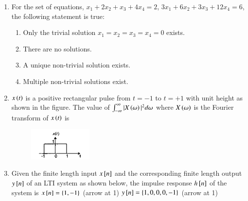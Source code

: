 \documentclass[12pt]{article}
\theoremstyle{remark}
\begin{document}
\begin{enumerate}
\item For the set of equations, $x_1 + 2x_2 + x_3 + 4x_4 = 2$, $3x_1 + 6x_2 + 3x_3 + 12x_4 = 6$, the following statement is true:
\begin{enumerate}
    \item Only the trivial solution $x_1=x_2=x_3=x_4=0$ exists.
    \item There are no solutions.
    \item A unique non-trivial solution exists.
    \item Multiple non-trivial solutions exist.
\end{enumerate}
\hfill{}

\item $x\left(t\right)$ is a positive rectangular pulse from $t=-1$ to $t=+1$ with unit height as shown in the figure. The value of $\int_{-\infty}^{\infty} |X\left(\omega\right)|^2 d\omega$ where $X\left(\omega\right)$ is the Fourier transform of $x\left(t\right)$ is
\begin{figure}[H]
    \centering
    \includegraphics[width=0.3\textwidth]{Figs/Q31.png}
    \caption{}
    \label{fig:1.21}
\end{figure}
\begin{enumerate}
\end{enumerate}
\hfill{}
\item Given the finite length input $x{}\left[n\right]$ and the corresponding finite length output $y{}\left[n\right]$ of an LTI system as shown below, the impulse response $h{}\left[n\right]$ of the system is
\newline $x{}\left[n\right]=\{1, -1\}$ (arrow at 1)
\newline $y{}\left[n\right]=\{1, 0, 0, 0, -1\}$ (arrow at 1)
\begin{enumerate}
\end{enumerate}
\hfill{}


\end{enumerate}
\end{document}
